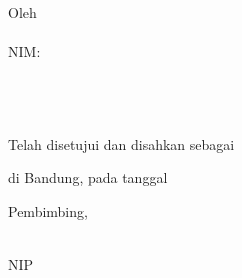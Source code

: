 
\clearpage

\begin{center}

    \large\bfseries\MakeUppercase{\judulta}

    \vfill

    \large \subtitle

    \vfill

    \normalsize Oleh \\[0.3em]
    \large \MakeUppercase{\penulis} \\[0.2em]
    NIM: \nim \\

    \prodi \\
	\normalsize \normalfont
	\fakultasplain \\
	\itb \\

    \vfill

    Telah disetujui dan disahkan sebagai \subtitle \\ 
    di Bandung, pada tanggal \tanggal~\bulan~\tahun

    \vspace{0.5cm}

    Pembimbing,

    \vspace{3cm}
    
    \underline{\pembimbing}\\
    NIP \nip

    \vfill
    
\end{center}

\clearpage
